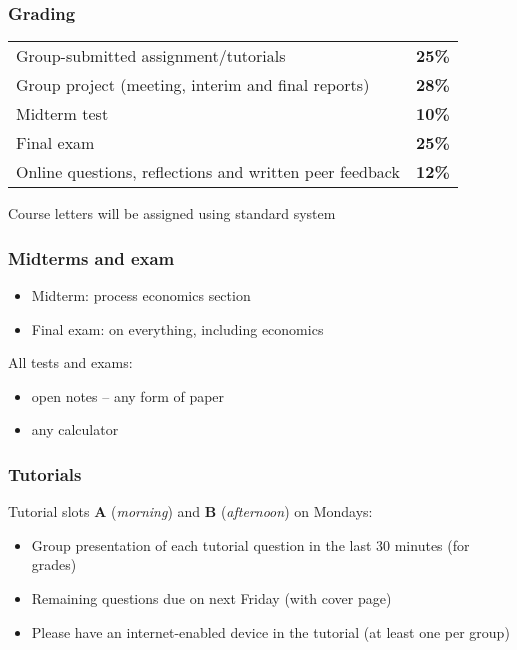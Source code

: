 \begin{frame}\frametitle{Grading}
	\begin{tabular}{lc}
		Group-submitted assignment/tutorials 					& \textbf{25\%} \\
		Group project (meeting, interim and final reports)		& \textbf{28\%} \\
		Midterm test											& \textbf{10\%} \\
		Final exam												& \textbf{25\%} \\
		Online questions, reflections and written peer feedback	& \textbf{12\%}
	\end{tabular}

	\vspace{24pt}
	Course letters will be assigned using standard system
\end{frame}

\begin{frame}\frametitle{Midterms and exam}

	\begin{itemize}
		\item	Midterm: process economics section
		\item	Final exam: on everything, including economics
	\end{itemize}
	\vspace{24pt}
	All tests and exams:
	\begin{itemize}
		\item	open notes -- any form of paper
		\item	any calculator
	\end{itemize}
\end{frame}

\begin{frame}\frametitle{Tutorials}
	Tutorial slots \textbf{A} (\emph{morning}) and \textbf{B} (\emph{afternoon}) on Mondays:

	\begin{itemize}
		\item	Group presentation of each tutorial question in the last 30 minutes {\scriptsize (for grades)}
		\item	Remaining questions due on next Friday {\scriptsize (with cover page)}
		\item	Please have an internet-enabled device in the tutorial (at least one per group)
	\end{itemize}
\end{frame}


